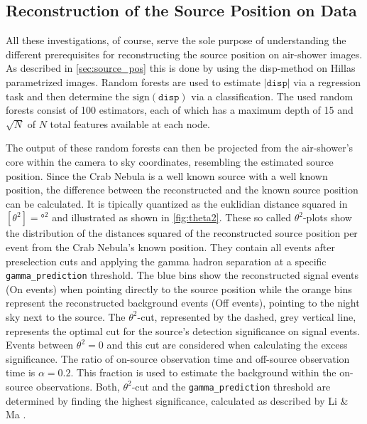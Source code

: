 \subsection{Reconstruction of the Source Position on Data}

All these investigations, of course, serve the sole purpose of understanding
the different prerequisites for reconstructing the source position on
air-shower images. As described in \autoref{sec:source_pos} this is done by
using the disp-method on Hillas parametrized images. Random forests
are used to estimate $|\texttt{disp}|$ via a regression task and then determine
the $\text{sign}(\texttt{disp})$ via a classification. The used random forests
consist of \num{100} estimators, each of which has a maximum depth of \num{15} and $\sqrt{N}$ of $N$ total features available at each node.

The output of these random forests can then be projected from the air-shower's
core within the camera to sky coordinates, resembling the estimated source
position. Since the Crab Nebula is a well known source with a well known
position, the difference between the reconstructed and the known source
position can be calculated. It is tipically quantized as the euklidian distance
squared in $[\theta^2] = \si{\degree\squared}$ and illustrated as shown in
\autoref{fig:theta2}. These so called $\theta^2$-plots show the distribution of the
distances squared of the reconstructed source position per event from the Crab
Nebula's known position. They contain all events after preselection cuts and
applying the gamma hadron separation at a specific \texttt{gamma\_prediction}
threshold. The blue bins show the reconstructed signal events (On events) when
pointing directly to the source position while the orange bins represent the
reconstructed background events (Off events), pointing to the night sky next to
the source. The $\theta^2$-cut, represented by the dashed, grey vertical line,
represents the optimal cut for the source's detection significance on signal events. Events between $\theta^2 = 0$ and this cut are considered when calculating the excess significance.
The ratio of on-source observation time and off-source observation time is
$\alpha = 0.2$. This fraction is used to estimate the background within the
on-source observations. Both, $\theta^2$-cut and the \texttt{gamma\_prediction}
threshold are determined by finding the highest significance, calculated as
described by Li \& Ma \cite{LiMa}.

